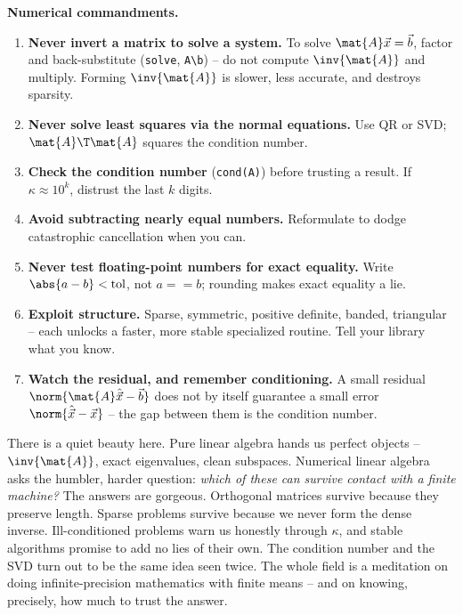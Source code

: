 \begin{focusbox}
\textbf{Numerical commandments.}
\begin{enumerate}
  \item \textbf{Never invert a matrix to solve a system.} To solve $\mat{A}\vec{x}=
    \vec{b}$, factor and back-substitute (\texttt{solve}, \texttt{A\textbackslash b}) --
    do not compute $\inv{\mat{A}}$ and multiply. Forming $\inv{\mat{A}}$ is slower, less
    accurate, and destroys sparsity.
  \item \textbf{Never solve least squares via the normal equations.} Use QR or SVD;
    $\mat{A}\T\mat{A}$ squares the condition number.
  \item \textbf{Check the condition number} (\texttt{cond(A)}) before trusting a
    result. If $\kappa\approx 10^{k}$, distrust the last $k$ digits.
  \item \textbf{Avoid subtracting nearly equal numbers.} Reformulate to dodge
    catastrophic cancellation when you can.
  \item \textbf{Never test floating-point numbers for exact equality.} Write
    $\abs{a-b} < \text{tol}$, not $a == b$; rounding makes exact equality a lie.
  \item \textbf{Exploit structure.} Sparse, symmetric, positive definite, banded,
    triangular -- each unlocks a faster, more stable specialized routine. Tell your
    library what you know.
  \item \textbf{Watch the residual, and remember conditioning.} A small residual
    $\norm{\mat{A}\hat{\vec{x}}-\vec{b}}$ does not by itself guarantee a small error
    $\norm{\hat{\vec{x}}-\vec{x}}$ -- the gap between them is the condition number.
\end{enumerate}
\end{focusbox}

\begin{aestheticbox}
There is a quiet beauty here. Pure linear algebra hands us perfect objects --
$\inv{\mat{A}}$, exact eigenvalues, clean subspaces. Numerical linear algebra asks the
humbler, harder question: \emph{which of these can survive contact with a finite
machine?} The answers are gorgeous. Orthogonal matrices survive because they preserve
length. Sparse problems survive because we never form the dense inverse. Ill-conditioned
problems warn us honestly through $\kappa$, and stable algorithms promise to add no
lies of their own. The condition number and the SVD turn out to be the same idea seen
twice. The whole field is a meditation on doing infinite-precision mathematics with
finite means -- and on knowing, precisely, how much to trust the answer.
\end{aestheticbox}

